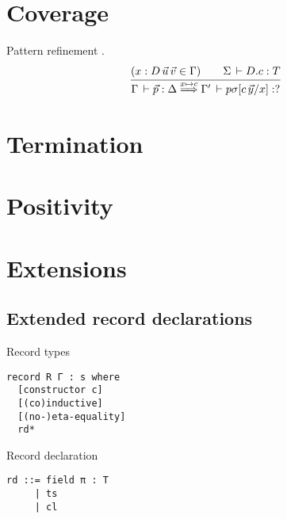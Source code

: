 \documentclass[acmlarge,fleqn]{acmart}\settopmatter{}
\begin{document}
\section{Coverage}
\label{sec:coverage}

Pattern refinement
.
\begin{gather*}
  \ru{(x : D\,\vec u\,\vec v \in \Gamma) \qquad \Sigma \der D.c : T
    }{\Gamma \der \vec p : \Delta \prefine x c \Gamma' \der p \sigma [c\,\vec y / x] : ?}
\end{gather*}

\section{Termination}
\label{sec:termination}

\section{Positivity}
\label{sec:positivity}

\section{Extensions}
\label{sec:extensions}

\subsection{Extended record declarations}

Record types
\begin{verbatim}
record R Γ : s where
  [constructor c]
  [(co)inductive]
  [(no-)eta-equality]
  rd*
\end{verbatim}

Record declaration
\begin{verbatim}
rd ::= field π : T
     | ts
     | cl
\end{verbatim}


\begin{acks}                            %
\end{acks}


%


\end{document}
